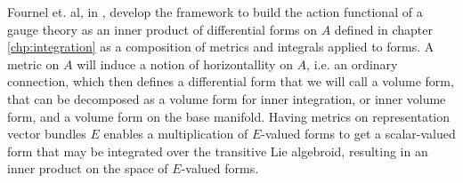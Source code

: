 Fournel et. al, in \cite{Fournel2013}, develop the framework to build the action functional of a gauge theory as an inner product of differential forms on $A$ defined in chapter \ref{chp:integration} as a composition of metrics and integrals applied to forms. A metric on $A$ will induce a notion of horizontallity on $A$, i.e. an ordinary connection, which then defines a differential form that we will call a volume form, that can be decomposed as a volume form for inner integration, or inner volume form, and a volume form on the base manifold. Having metrics on representation vector bundles $E$ enables a multiplication of $E$-valued forms to get a scalar-valued form that may be integrated over the transitive Lie algebroid, resulting in an inner product on the space of $E$-valued forms.





